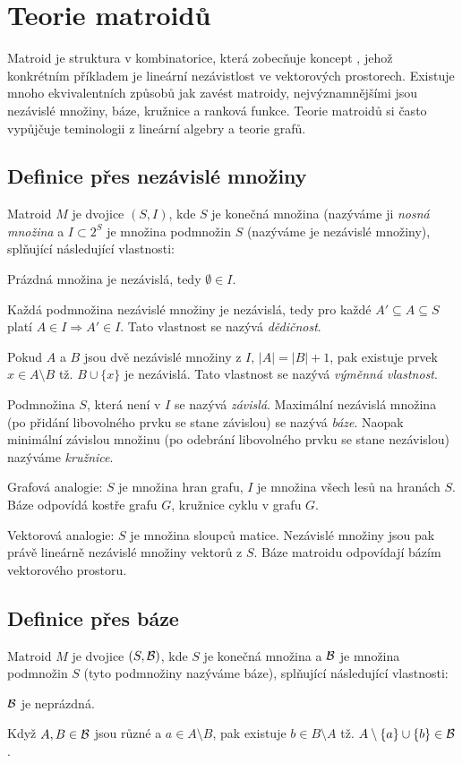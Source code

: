 \section{Teorie matroidů}

Matroid je struktura v kombinatorice, která zobecňuje koncept
, jehož konkrétním příkladem je lineární nezávistlost ve
vektorových prostorech. Existuje mnoho ekvivalentních způsobů jak zavést
matroidy, nejvýznamnějšími jsou nezávislé množiny, báze, kružnice a ranková
funkce. Teorie matroidů si často vypůjčuje teminologii z lineární algebry a
teorie grafů.

\subsection{Definice přes nezávislé množiny}
\df Matroid $M$ je dvojice $(S,I)$, kde $S$ je konečná množina (nazýváme ji
\emph{nosná množina} a $I \subset 2^S$ je množina podmnožin $S$ (nazýváme je
nezávislé množiny), splňující následující vlastnosti:
\begin{enumerate*}
\item Prázdná množina je nezávislá, tedy $\emptyset \in I$.
\item Každá podmnožina nezávislé množiny je nezávislá, tedy pro každé $A' \subseteq A \subseteq S$ platí $A \in I \Rightarrow A' \in I$. Tato vlastnost se nazývá \emph{dědičnost}.
\item Pokud $A$ a $B$ jsou dvě nezávislé množiny z $I$, $|A| = |B| + 1$, pak existuje prvek $x\in A\setminus B$ tž. $B\cup\{x\}$ je nezávislá. Tato vlastnost se nazývá \emph{výměnná vlastnost}.
\end{enumerate*}

\df Podmnožina $S$, která není v $I$ se nazývá \emph{závislá}. Maximální nezávislá
množina (po přidání libovolného prvku se stane závislou) se nazývá \emph{báze}.
Naopak minimální závislou množinu (po odebrání libovolného prvku se stane
nezávislou) nazýváme \emph{kružnice}.

\pzn Grafová analogie: $S$ je množina hran grafu, $I$ je množina všech lesů na
hranách $S$. Báze odpovídá kostře grafu $G$, kružnice cyklu v grafu $G$.

\pzn Vektorová analogie: $S$ je množina sloupců matice. Nezávislé množiny jsou
pak právě lineárně nezávislé množiny vektorů z $S$. Báze matroidu odpovídají
bázím vektorového prostoru. 

\subsection{Definice přes báze}
\df Matroid $M$ je dvojice $(S,\mathcal{B})$, kde $S$ je konečná množina a $\mathcal{B}$ je
množina podmnožin $S$ (tyto podmnožiny nazýváme báze), splňující následující
vlastnosti:
\begin{enumerate*}
\item $\mathcal{B}$ je neprázdná.
\item Když $A,B \in \mathcal{B}$ jsou různé a $a \in A\setminus B$, pak existuje $b \in B\setminus A$ tž. $A\setminus\{a\}\cup\{b\} \in \mathcal{B}$.
\end{enumerate*}

